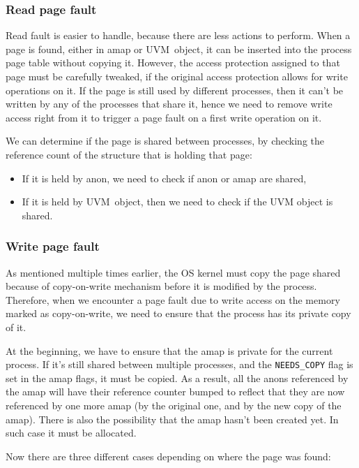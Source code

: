 \subsubsection{Read page fault}

Read fault is easier to handle, because there are less actions to perform.
When a page is found, either in amap or UVM~object, it can be inserted into the process page table without copying it.
However, the access protection assigned to that page must be carefully tweaked, if the original access protection allows for write operations on it.
If the page is still used by different processes, then it can't be written by any of the processes that share it,
hence we need to remove write access right from it to trigger a page fault on a first write operation on it.

We can determine if the page is shared between processes, by checking the reference count of the structure that is holding that page:
\begin{itemize}
  \item If it is held by anon, we need to check if anon or amap are shared,
  \item If it is held by UVM~object, then we need to check if the UVM object is shared.
\end{itemize}

\subsubsection{Write page fault}

As mentioned multiple times earlier, the OS kernel must copy the page shared because of copy-on-write mechanism before it is modified by the process.
Therefore, when we encounter a page fault due to write access on the memory marked as copy-on-write, we need to ensure that the process has its private copy of it.

At the beginning, we have to ensure that the amap is private for the current process.
If it's still shared between multiple processes, and the \texttt{NEEDS_COPY} flag is set in the amap flags, it must be copied.
As a result, all the anons referenced by the amap will have their reference counter bumped to reflect that they are now referenced by one more amap
(by the original one, and by the new copy of the amap).
There is also the possibility that the amap hasn't been created yet.
In such case it must be allocated.

Now there are three different cases depending on where the page was found:

